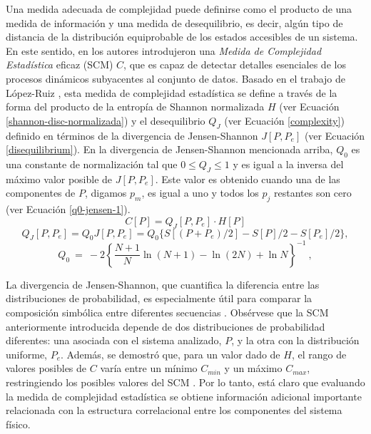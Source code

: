 Una medida adecuada de complejidad puede definirse como el producto de una medida de información y una medida de desequilibrio, es decir, algún tipo de distancia de la distribución equiprobable de los estados accesibles de un sistema.
En este sentido, en \cite{Lamberti2004} los autores introdujeron una {\it Medida de Complejidad Estadística \/} eficaz (SCM) $C$, que es capaz de detectar detalles esenciales de los procesos dinámicos subyacentes al conjunto de datos.
Basado en el trabajo de López-Ruiz \cite{Lopez1995}, esta medida de complejidad estadística \cite{Martin2003,Lamberti2004} se define a través de la forma del producto de la entropía de Shannon normalizada $H$ (ver Ecuación \eqref{shannon-disc-normalizada}) y el desequilibrio $Q_{J}$ (ver Ecuación \ref{complexity}) definido en términos de la divergencia de Jensen-Shannon $J[P, P_e]$ (ver Ecuación \ref{disequilibrium}). En la divergencia de Jensen-Shannon mencionada arriba, $Q_0$ es una constante de normalización tal que $0 \leq Q_{J} \leq 1$ y es igual a la inversa del máximo valor posible de $J [P,P_e]$.
Este valor es obtenido cuando una de las componentes de $P$, digamos $p_m$, es igual a uno y todos los $p_j$ restantes son cero (ver Ecuación \ref{q0-jensen-1}).
\begin{equation}
C[P] = Q_{J}[P,P_e] \cdot H[P]
\label{complexity}
\end{equation}
\begin{equation}
\label{disequilibrium}	
Q_{J} [ P, P_e] = Q_{0} J[ P, P_e] = Q_{0} \{ S[(P + P_e)/2 ] - S[ P ]/2 - S[P_e]/2\},
\end{equation}
\begin{equation}
Q_0 ~=~ -2 \left\{ {\frac{N+1}{N}} \ln (N+1) - \ln (2N) + \ln N \right\}^{-1} \ ,
\label{q0-jensen-1}
\end{equation}

La divergencia de Jensen-Shannon, que cuantifica la diferencia entre las distribuciones de probabilidad, es especialmente útil para comparar la composición simbólica entre diferentes secuencias \cite{Grosse2002}.
Obsérvese que la SCM anteriormente introducida depende de dos distribuciones de probabilidad diferentes: una asociada con el sistema analizado, $P$, y la otra con la distribución uniforme, $P_e$.
Además, se demostró que, para un valor dado de $H$, el rango de valores posibles de $C$ varía entre un mínimo $C_ {min}$ y un máximo $C_ {max}$, restringiendo los posibles valores del SCM \cite{Martin2006}.
Por lo tanto, está claro que evaluando la medida de complejidad estadística se obtiene información adicional importante relacionada con la estructura correlacional entre los componentes del sistema físico.

